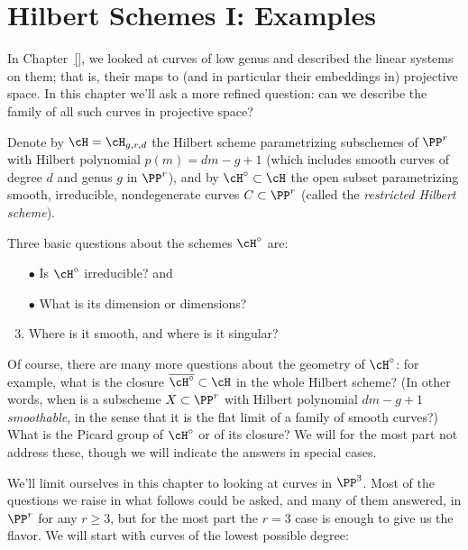 

\chapter{Hilbert Schemes I: Examples}
\label{HilbertSchemesChapter}

In Chapter~\ref{}, we looked at curves of low genus and described the linear systems on them; that is, their maps to (and in particular their embeddings in) projective space. In this chapter we'll ask a more refined question: can we describe the family of all such curves in projective space?


 Denote by $\cH = \cH_{g,r,d}$ the Hilbert scheme parametrizing subschemes of $\PP^r$ with Hilbert polynomial $p(m) = dm-g+1$ (which includes smooth
curves of degree $d$ and genus $g$ in $\PP^r$), and by $\cH^\circ \subset \cH$ the open subset parametrizing smooth, irreducible, nondegenerate curves $C \subset \PP^r$ (called the \emph{restricted Hilbert scheme}). 

Three basic questions about the schemes $\cH^\circ$ are:

\begin{enumerate}
\item[$\bullet$] Is $\cH^\circ$ irreducible? and
\item[$\bullet$]  What is its dimension or dimensions?
\item Where is it smooth, and where is it singular?
\end{enumerate}

Of course, there are many more questions about the geometry of $\cH^\circ$: for example,  what is the closure $\overline{\cH^\circ} \subset \cH$ in the whole Hilbert scheme? (In other words, when is a subscheme $X \subset \PP^r$ with Hilbert polynomial $dm-g+1$ \emph{smoothable}, in the sense that it is the flat limit of a family of smooth curves?) What is the Picard group of $\cH^\circ$ or of its closure? We will for the most part not address these, though we will indicate the answers in special cases.

We'll limit ourselves in this chapter to looking at curves in $\PP^3$. Most of the questions we raise in what follows could be asked, and many of them answered, in $\PP^r$ for any $r \geq 3$, but for the most part the $r=3$ case is enough to give us the flavor. We will start with curves of the lowest possible degree:

